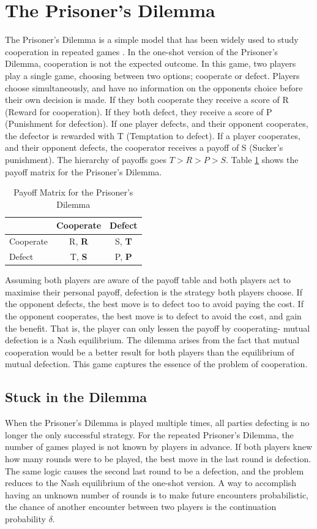 \documentclass[a4paper,11pt,bcshonoursthesis,singlespace,twoside,thesisdraft,pdflatex]{cssethesis}
\begin{document}
\section{The Prisoner's Dilemma}
The Prisoner's Dilemma is a simple model that has been widely used to study cooperation in repeated games \citep{Axelrod1997}. 
In the one-shot version of the Prisoner's Dilemma, cooperation is not the expected outcome. 
In this game, two players play a single game, choosing between two options; cooperate or defect. 
Players choose simultaneously, and have no information on the opponents choice before their own decision is made. 
If they both cooperate they receive a score of R (Reward for cooperation). 
If they both defect, they receive a score of P (Punishment for defection). 
If one player defects, and their opponent cooperates, the defector is rewarded with T (Temptation to defect). 
If a player cooperates, and their opponent defects, the cooperator receives a payoff of S (Sucker's punishment). 
The hierarchy of payoffs goes $T>R>P>S$. Table \ref{table:payoffs} shows the payoff matrix for the Prisoner's Dilemma. 
\begin{table}[h]\centering
\captionsetup{justification=centering}
\begin{tabular}{|l|c|c|}
\hline
 & \bf{Cooperate} & \bf{Defect}\\
\hline
Cooperate & R, \bf{R} & S, \bf{T}\\
\hline
Defect & T, \bf{S}  & P, \bf{P} \\
\hline
\end{tabular}
\caption{Payoff Matrix for the Prisoner's Dilemma}
\label{table:payoffs}
\end{table}

Assuming both players are aware of the payoff table and both players act to maximise their personal payoff, defection is the strategy both players choose. 
If the opponent defects, the best move is to defect too to avoid paying the cost. 
If the opponent cooperates, the best move is to defect to avoid the cost, and gain the benefit. 
That is, the player can only lessen the payoff by cooperating- mutual defection is a Nash equilibrium. 
The dilemma arises from the fact that mutual cooperation would be a better result for both players than the equilibrium of mutual defection. 
This game captures the essence of the problem of cooperation.

\subsection{Stuck in the Dilemma}
When the Prisoner's Dilemma is played multiple times, all parties defecting is no longer the only successful strategy. 
For the repeated Prisoner's Dilemma, the number of games played is not known by players in advance. 
If both players knew how many rounds were to be played, the best move in the last round is defection. 
The same logic causes the second last round to be a defection, and the problem reduces to the Nash equilibrium of the one-shot version. 
A way to accomplish having an unknown number of rounds is to make future encounters probabilistic, the chance of another encounter between two players is the continuation probability $\delta$.
\end{document}
